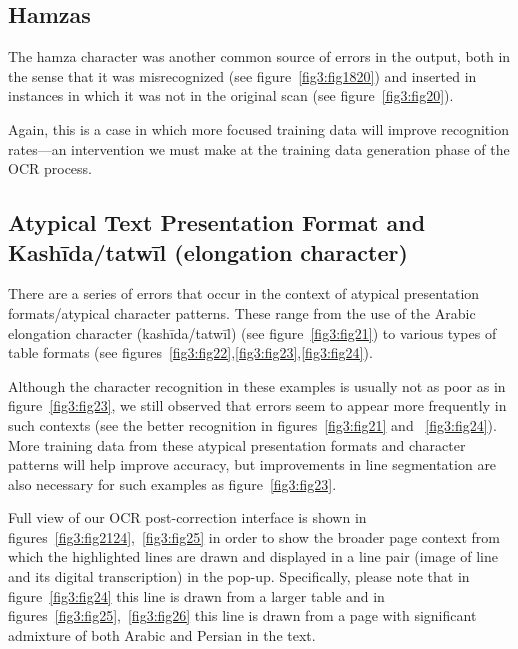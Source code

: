 \subsection{Hamzas}

The hamza character was another common source of errors in the output, both in
the sense that it was misrecognized (see figure~\ref{fig3:fig1820}) and inserted
in instances in which it was not in the original scan (see
figure~\ref{fig3:fig20}). 

Again, this is a case in which more focused training data will improve
recognition rates—an intervention we must make at the training data generation
phase of the OCR process.  

\subsection{Atypical Text Presentation Format and Kashīda/tatwīl (elongation character)}

There are a series of errors that occur in the context of atypical presentation
formats/atypical character patterns. These range from the use of the Arabic
elongation character (kashīda/tatwīl) (see figure~\ref{fig3:fig21}) to various types of table
formats (see figures~\ref{fig3:fig22},\ref{fig3:fig23},\ref{fig3:fig24}).

Although the character recognition in these examples is usually not as poor as
in figure~\ref{fig3:fig23}, we still observed that errors seem to appear more
frequently in such contexts (see the better recognition in
figures~\ref{fig3:fig21} and ~\ref{fig3:fig24}). More training data from these
atypical presentation formats and character patterns will help improve
accuracy, but improvements in line segmentation are also necessary for such
examples as figure~\ref{fig3:fig23}.

Full view of our OCR post-correction interface is shown in
figures~\ref{fig3:fig2124},~\ref{fig3:fig25} in order to show the broader page
context from which the highlighted lines are drawn and displayed in a line pair
(image of line and its digital transcription) in the pop-up. Specifically,
please note that in figure~\ref{fig3:fig24} this line is drawn from a larger
table and in figures~\ref{fig3:fig25},~\ref{fig3:fig26} this line is drawn from
a page with significant admixture of both Arabic and Persian in the text.

